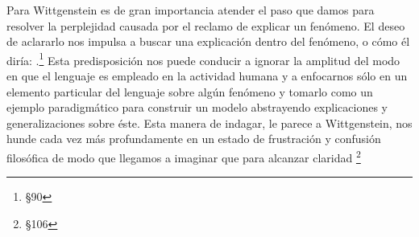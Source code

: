 Para Wittgenstein es de gran importancia atender el paso que damos para resolver
la perplejidad causada por el reclamo de explicar un fenómeno. El deseo de
aclararlo nos impulsa a buscar una explicación dentro del fenómeno, o cómo él
diría: .\footnote{\S90} Esta predisposición nos puede conducir a ignorar la
amplitud del modo en que el lenguaje es empleado en la actividad humana y a
enfocarnos sólo en un elemento particular del lenguaje sobre algún fenómeno y
tomarlo como un ejemplo paradigmático para construir un modelo abstrayendo
explicaciones y generalizaciones sobre éste. Esta manera de indagar, le parece a
Wittgenstein, nos hunde cada vez más profundamente en un estado de frustración y
confusión filosófica de modo que llegamos a imaginar que para alcanzar claridad
\footnote{\S106}

